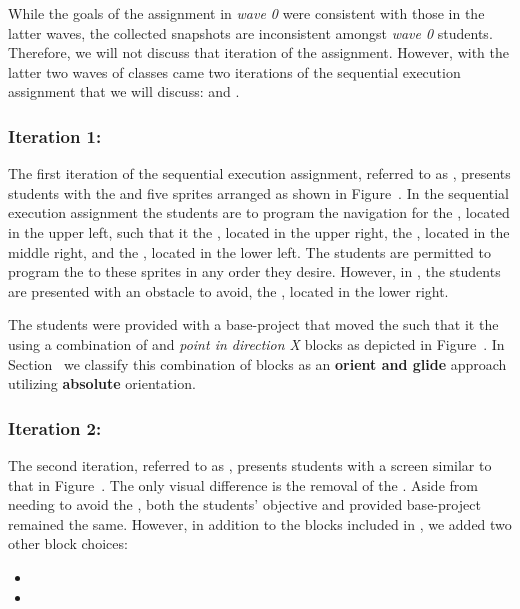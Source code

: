 While the goals of the assignment in \emph{wave 0} were consistent with those
in the latter waves, the collected snapshots are inconsistent amongst
\emph{wave 0} students. Therefore, we will not discuss that iteration of the
assignment. However, with the latter two waves of classes came two iterations
of the sequential execution assignment that we will discuss: \sone{} and
\stwo{}.

\subsubsection{Iteration 1: \sone{}}
The first iteration of the sequential execution assignment, referred to as
\sone{}, presents students with the \stage{} and five sprites arranged as shown
in Figure~. In the sequential execution assignment the
students are to program the navigation for the \net{}, located in the upper
left, such that it  the \bear{}, located in the upper right, the
\horse{}, located in the middle right, and the \zebra{}, located in the lower
left. The students are permitted to program the \net{} to \catch{} these
sprites in any order they desire. However, in \sone{}, the students are
presented with an obstacle to avoid, the \snake{}, located in the lower right.

The students were provided with a base-project that moved the \net{} such that
it \caught{} the \zebra{} using a combination of \glideDIST{} and \emph{point
  in direction X} blocks as depicted in
Figure~. In Section~ we
classify this combination of blocks as an \textbf{orient and glide} approach
utilizing \textbf{absolute} orientation.

\subsubsection{Iteration 2: \stwo{}}
The second iteration, referred to as \stwo{}, presents students with a screen
similar to that in Figure~. The only visual difference
is the removal of the \snake{}. Aside from needing to avoid the \snake{}, both
the students' objective and provided base-project remained the same. However,
in addition to the blocks included in \sone{}, we added two other block
choices:

\begin{itemize}
\item \pointtoward{}
\item \glideto{}
\end{itemize}

